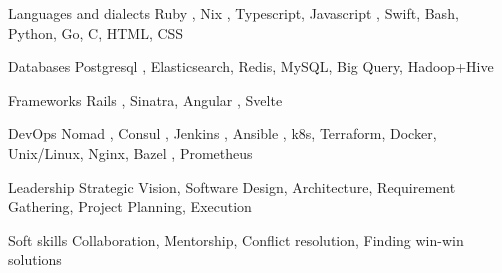 
\begin{cvskills}

  \cvskill
    {Languages and dialects} %
    {Ruby \cvstar, Nix \cvstar, Typescript, Javascript \cvstar, Swift, Bash, Python, Go, C, HTML, CSS} %

  \cvskill
    {Databases} %
    {Postgresql \cvstar, Elasticsearch, Redis, MySQL, Big Query, Hadoop+Hive} %

  \cvskill
    {Frameworks} %
    {Rails \cvstar, Sinatra, Angular \cvstar, Svelte} %

  \cvskill
    {DevOps} %
    {Nomad \cvstar, Consul \cvstar, Jenkins \cvstar, Ansible \cvstar, k8s, Terraform, Docker, Unix/Linux, Nginx, Bazel \cvstar, Prometheus} %

  \cvskill
    {Leadership} %
    {Strategic Vision, Software Design, Architecture, Requirement Gathering, Project Planning, Execution} %

  \cvskill
    {Soft skills} %
    {Collaboration, Mentorship, Conflict resolution, Finding win-win solutions} %


\end{cvskills}
